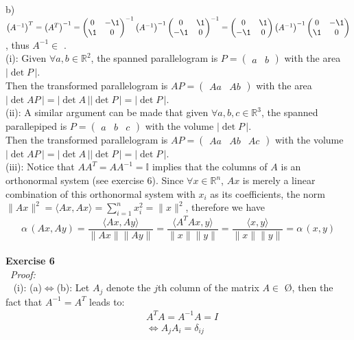\documentclass[12pt]{article}
\def\dotp#1#2{\langle#1,#2\rangle}
\def\ss#1#2{\sum_{#1=1}^{#2}}
\def\ep#1#2{{\bf Exercise #1}\\~{\it Proof:}\\~#2\\[1em]}
\def\inn#1#2{(#1): #2\\[0.5em]}
\newcommand{\eq}[1]{\begin{align*}#1\end{align*}}
\begin{document}
{ b) ${\left(A^{-1}\right)}^{T}={\left(A^{T}\right)}^{-1}={\begin{pmatrix}0&-\1\\\1&0\end{pmatrix}}^{-1}\left(A^{-1}\right)^{-1}{\begin{pmatrix}0&\1\\ -\1&0\end{pmatrix}}^{-1}=\begin{pmatrix}0&\1\\ -\1&0\end{pmatrix}{\left(A^{-1}\right)}^{-1}\begin{pmatrix}0&-\1\\\1&0\end{pmatrix}$, thus $A^{-1}\in$ \Sp.\\[0.5 em]
 \inn{i}{
 	Given $\forall a,b\in\mathbb{R}^2$, the spanned parallelogram is 
	$P=\begin{pmatrix}a&b\end{pmatrix}$
	with the area $|\det P\,|$.\\
	Then the transformed parallelogram is $AP=\begin{pmatrix}Aa&Ab\end{pmatrix}$
	with the area $|\det AP\,|=|\det A\,||\det P\,|=|\det P\,|$.
 }
 \inn{ii}{
 	A similar argument can be made that given $\forall a,b,c\in\mathbb{R}^3$, the spanned parallepiped is
	$P=\begin{pmatrix}a&b&c\end{pmatrix}$
	with the volume $|\det P\,|$.\\
	Then the transformed parallelogram is $AP=\begin{pmatrix}Aa&Ab&Ac\end{pmatrix}$
	with the volume $|\det AP\,|=|\det A\,||\det P\,|=|\det P\,|$.
 }
 \inn{iii}{
 	Notice that $AA^{T}=AA^{-1}=\mathbb{I}$ implies that the columns of $A$ is an orthonormal system (see exercise 6). Since $\forall x\in\mathbb{R}^n$, $Ax$ is merely a linear combination of this orthonormal system with $x_i$ as its coefficients, the norm $\|Ax\|^2=\dotp{Ax}{Ax}=\ss{i}{n}x_i^2=\|x\|^2$, therefore we have
	\[
	\alpha\,(Ax,Ay)=\frac{\dotp{Ax}{Ay}}{\|Ax\|\|Ay\|}=\frac{\dotp{A^TAx}{y}}{\|x\|\|y\|}=\frac{\dotp{x}{y}}{{\|x\|\|y\|}}=\alpha\,(x,y)
	\]
 }
 \ep{6}{
 	\inn{i}{
	(a)$\iff$(b): Let $A_j$ denote the $j$th column of the matrix $A\in$ \O, 
	then the fact that $A^{-1}=A^{T}$ leads to:
	\eq{
	&A^{T}A=A^{-1}A=I\\
	&\iff A_jA_i=\delta_{ij}\\
	}
	}
 }
 }
\end{document}
